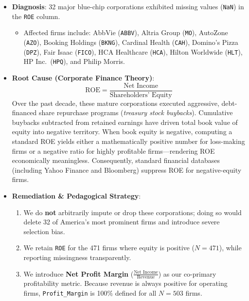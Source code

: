 \documentclass[
]{article}
\providecommand{\tightlist}{%
  \setlength{\itemsep}{0pt}\setlength{\parskip}{0pt}}
\begin{document}
\begin{itemize}
\tightlist
\item
  \textbf{Diagnosis}: 32 major blue-chip corporations exhibited missing
  values (\texttt{NaN}) in the \texttt{ROE} column.

  \begin{itemize}
  \tightlist
  \item
    Affected firms include: AbbVie (\texttt{ABBV}), Altria Group
    (\texttt{MO}), AutoZone (\texttt{AZO}), Booking Holdings
    (\texttt{BKNG}), Cardinal Health (\texttt{CAH}), Domino's Pizza
    (\texttt{DPZ}), Fair Isaac (\texttt{FICO}), HCA Healthcare
    (\texttt{HCA}), Hilton Worldwide (\texttt{HLT}), HP
    Inc.~(\texttt{HPQ}), and Philip Morris.
  \end{itemize}
\item
  \textbf{Root Cause (Corporate Finance Theory)}:
  \[\text{ROE} = \frac{\text{Net Income}}{\text{Shareholders' Equity}}\]
  Over the past decade, these mature corporations executed aggressive,
  debt-financed share repurchase programs (\emph{treasury stock
  buybacks}). Cumulative buybacks subtracted from retained earnings have
  driven total book value of equity into negative territory. When book
  equity is negative, computing a standard ROE yields either a
  mathematically positive number for loss-making firms or a negative
  ratio for highly profitable firms---rendering ROE economically
  meaningless. Consequently, standard financial databases (including
  Yahoo Finance and Bloomberg) suppress ROE for negative-equity firms.
\item
  \textbf{Remediation \& Pedagogical Strategy}:

  \begin{enumerate}
  \def\labelenumi{\arabic{enumi}.}
  \tightlist
  \item
    We do \textbf{not} arbitrarily impute or drop these corporations;
    doing so would delete 32 of America's most prominent firms and
    introduce severe selection bias.
  \item
    We retain \texttt{ROE} for the 471 firms where equity is positive
    (\(N = 471\)), while reporting missingness transparently.
  \item
    We introduce \textbf{Net Profit Margin}
    (\(\frac{\text{Net Income}}{\text{Revenue}}\)) as our co-primary
    profitability metric. Because revenue is always positive for
    operating firms, \texttt{Profit\_Margin} is 100\% defined for all
    \(N = 503\) firms.
  \end{enumerate}
\end{itemize}
\end{document}
